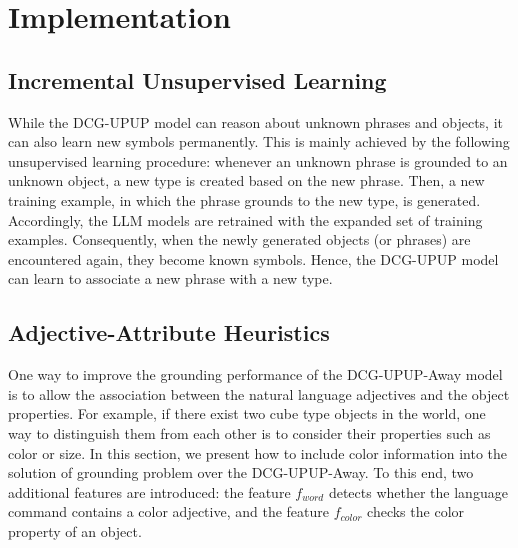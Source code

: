\section{Implementation}
\label{sec:implementation}
\subsection{Incremental Unsupervised Learning}
While the DCG-UPUP model can reason about unknown phrases and objects, it can also learn new symbols permanently. This is mainly achieved by the following unsupervised learning procedure: whenever an unknown phrase is grounded to an unknown object, a new type is created based on the new phrase. Then, a new training example, in which the phrase grounds to the new
type, is generated. Accordingly, the LLM models are retrained with the expanded set of training examples. Consequently, when the newly generated objects (or phrases) are encountered again, they become known symbols. Hence, the DCG-UPUP model can learn to associate a new phrase with a new type.


\subsection{Adjective-Attribute Heuristics}
\label{sec:color}
One way to improve the grounding performance of the DCG-UPUP-Away model is to allow the association between the natural language adjectives and the object properties. For example, if there exist two cube type objects in the world, one way to distinguish them from each other is to consider their properties such as color or size. In this section, we present how to include color information into the solution of grounding problem over the DCG-UPUP-Away. To this end, two additional features are introduced: the feature $f_{word}$ detects whether the language command contains a color adjective, and the feature $f_{color}$ checks the color property of an object.     

